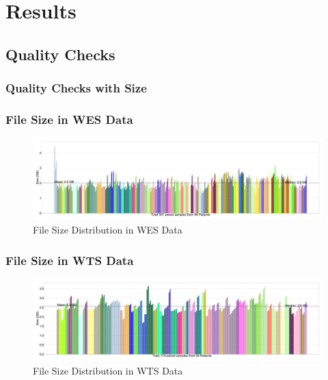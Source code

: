 \documentclass{beamer}
\begin{document}
    \section{Results}
    \subsection{Quality Checks}
    \subsubsection{Quality Checks with Size}
    \begin{frame}
        \frametitle{File Size in WES Data}

        \begin{figure}
            \includegraphics[width=\linewidth]{figures/Size/WES.pdf}
            \caption{File Size Distribution in WES Data}
        \end{figure}
    \end{frame}

    \begin{frame}
        \frametitle{File Size in WTS Data}

        \begin{figure}
            \includegraphics[width=\linewidth]{figures/Size/WTS.pdf}
            \caption{File Size Distribution in WTS Data}
        \end{figure}
    \end{frame}
\end{document}
